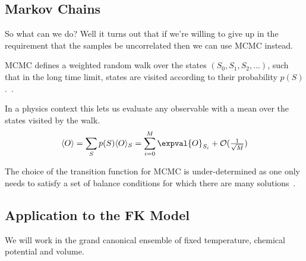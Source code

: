 \hypertarget{markov-chains}{%
\subsection{Markov Chains}\label{markov-chains}}

So what can we do? Well it turns out that if we're willing to give up in the requirement that the samples be uncorrelated then we can use MCMC instead.

MCMC defines a weighted random walk over the states \((S_0, S_1, S_2, ...)\), such that in the long time limit, states are visited according to their probability \(p(S)\).~\autocite{binderGuidePracticalWork1988,kerteszAdvancesComputerSimulation1998,wolffMonteCarloErrors2004}.

In a physics context this lets us evaluate any observable with a mean over the states visited by the walk. \[\begin{aligned}
\langle O \rangle & = \sum_{S} p(S) \langle O \rangle_{S} = \sum_{i = 0}^{M} \expval{O}_{S_i} + \mathcal{O}(\tfrac{1}{\sqrt{M}})\\
\end{aligned}\]

The choice of the transition function for MCMC is under-determined as one only needs to satisfy a set of balance conditions for which there are many solutions~\autocite{kellyReversibilityStochasticNetworks1981}.

\hypertarget{application-to-the-fk-model}{%
\subsection{Application to the FK Model}\label{application-to-the-fk-model}}

We will work in the grand canonical ensemble of fixed temperature, chemical potential and volume.

